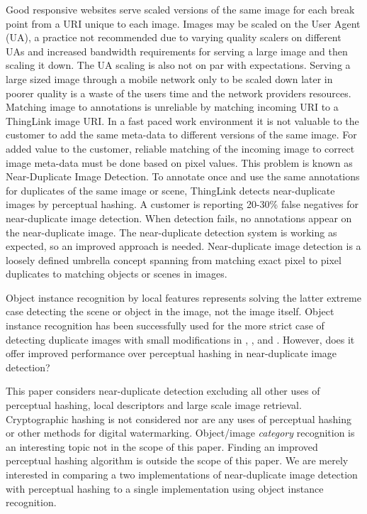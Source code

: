 \documentclass[english,12pt,a4paper,pdftex,elec,utf8, table]{aaltothesis}
\begin{document}
Good responsive websites serve scaled versions of the same image for each break point from a URI unique to each image. Images may be scaled on the User Agent (UA), a practice not recommended due to varying quality scalers on different UAs and increased bandwidth requirements for serving a large image and then scaling it down. The UA scaling is also not on par with expectations. Serving a large sized image through a mobile network only to be scaled down later in poorer quality is a waste of the users time and the network providers resources. Matching image to annotations is unreliable by matching incoming URI to a ThingLink image URI. In a fast paced work environment it is not valuable to the customer to add the same meta-data to different versions of the same image. For added value to the customer, reliable matching of the incoming image to correct image meta-data must be done based on pixel values. This problem is known as Near-Duplicate Image Detection. To annotate once and use the same annotations for duplicates of the same image or scene, ThingLink detects near-duplicate images by perceptual hashing. A customer is reporting 20-30\% false negatives for near-duplicate image detection. When detection fails, no annotations appear on the near-duplicate image. The near-duplicate detection system is working as expected, so an improved approach is needed. Near-duplicate image detection is a loosely defined umbrella concept spanning from matching exact pixel to pixel duplicates to matching objects or scenes in images.

Object instance recognition by local features represents solving the latter extreme case detecting the scene or object in the image, not the image itself. Object instance recognition has been successfully used for the more strict case of detecting duplicate images with small modifications in \cite{Chum2008}, \cite{Chum2010}, \cite{Lee2010} and \cite{dong2012high}. However, does it offer improved performance over perceptual hashing in near-duplicate image detection?

This paper considers near-duplicate detection excluding all other uses of perceptual hashing, local descriptors and large scale image retrieval. Cryptographic hashing is not considered nor are any uses of perceptual hashing or other methods for digital watermarking. Object/image \emph{category} recognition is an interesting topic not in the scope of this paper. Finding an improved perceptual hashing algorithm is outside the scope of this paper. We are merely interested in comparing a two implementations of near-duplicate image detection with perceptual hashing to a single implementation using object instance recognition.
\end{document}
